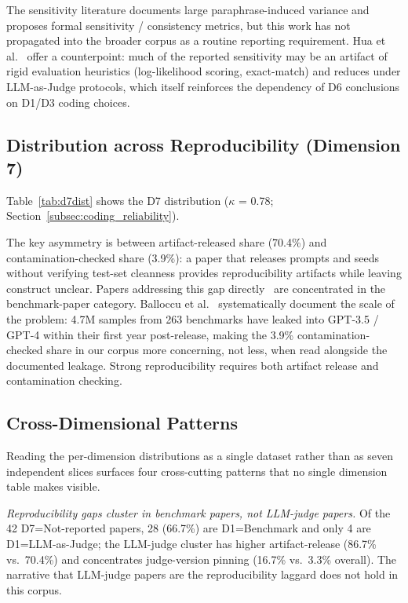 \documentclass[acmsmall, nonacm, screen]{acmart}
\begin{document}
The sensitivity literature
\cite{sclar2023formatting, butterfly2024, promptsensitivity2025,
mizrahi2024state, polo2024promptseval, bellibatlu2026judgesense,
errica2024sensitivity, zhuo2024prosa} documents large
paraphrase-induced variance and proposes formal sensitivity /
consistency metrics, but this work has not propagated into the
broader corpus as a routine reporting requirement. Hua et
al.~\cite{hua2025flaworartifact} offer a counterpoint: much of the
reported sensitivity may be an artifact of rigid evaluation
heuristics (log-likelihood scoring, exact-match) and reduces under
LLM-as-Judge protocols, which itself reinforces the dependency of
D6 conclusions on D1/D3 coding choices.

\subsection{Distribution across Reproducibility (Dimension 7)}
\label{subsec:d7dist}

Table~\ref{tab:d7dist} shows the D7 distribution
($\kappa$ = 0.78; Section~\ref{subsec:coding_reliability}).


The key asymmetry is between artifact-released share (70.4\%) and
contamination-checked share (3.9\%): a paper that releases prompts
and seeds without verifying test-set cleanness provides
reproducibility artifacts while leaving construct unclear. Papers
addressing this gap directly~\cite{sainz2023nlp, deng2023investigating,
yang2023rethinking, wang2024benchmark, mcintosh2024inadequacies} are
concentrated in the benchmark-paper category. Balloccu et
al.~\cite{balloccu2024leakcheat} systematically document the scale
of the problem: 4.7M samples from 263 benchmarks have leaked into
GPT-3.5 / GPT-4 within their first year post-release, making the
3.9\% contamination-checked share in our corpus more concerning, not
less, when read alongside the documented leakage. Strong
reproducibility requires both artifact release and contamination
checking.

\subsection{Cross-Dimensional Patterns}
\label{subsec:crossdim}

Reading the per-dimension distributions as a single dataset rather
than as seven independent slices surfaces four cross-cutting patterns
that no single dimension table makes visible.

\textit{Reproducibility gaps cluster in benchmark papers, not
LLM-judge papers.} Of the 42 D7=Not-reported papers, 28 (66.7\%) are
D1=Benchmark and only 4 are D1=LLM-as-Judge; the LLM-judge cluster
has higher artifact-release (86.7\% vs.\ 70.4\%) and concentrates
judge-version pinning (16.7\% vs.\ 3.3\% overall). The narrative
that LLM-judge papers are the reproducibility laggard does not hold
in this corpus.
\end{document}
